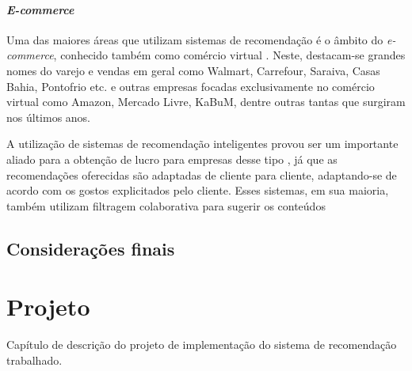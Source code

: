 \documentclass[
	12pt,				%
	a4paper,			%
	english,			%
	french,				%
	spanish,			%
	brazil				%
	]{abntex2}
\begin{document}
\subsubsection{\emph{E-commerce}}

Uma das maiores áreas que utilizam sistemas de recomendação é o âmbito do \emph{e-commerce}, conhecido também como comércio virtual \cite{schafer1999recommender}. Neste, destacam-se grandes nomes do varejo e vendas em geral como Walmart, Carrefour, Saraiva, Casas Bahia, Pontofrio etc. e outras empresas focadas exclusivamente no comércio virtual como Amazon, Mercado Livre, KaBuM, dentre outras tantas que surgiram nos últimos anos. \cite{schafer2001commerce}

A utilização de sistemas de recomendação inteligentes provou ser um importante aliado para a obtenção de lucro para empresas desse tipo \cite{xiao2007commerce}, já que as recomendações oferecidas são adaptadas de cliente para cliente, adaptando-se de acordo com os gostos explicitados pelo cliente. Esses sistemas, em sua maioria, também utilizam filtragem colaborativa para sugerir os conteúdos

\section{Considerações finais}

\chapter{Projeto}\label{cap_projeto}

Capítulo de descrição do projeto de implementação do sistema de recomendação trabalhado.




\postextual


\end{document}
